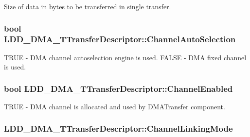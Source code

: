 Size of data in bytes to be transferred in single transfer. \hypertarget{struct_l_d_d___d_m_a___t_transfer_descriptor_aae81aa421cebab862ae4b8ca9d384318}{
\subsubsection[{Channel\-Auto\-Selection}]{\setlength{\rightskip}{0pt plus 5cm}bool L\-D\-D\-\_\-\-D\-M\-A\-\_\-\-T\-Transfer\-Descriptor\-::\-Channel\-Auto\-Selection}}\label{struct_l_d_d___d_m_a___t_transfer_descriptor_aae81aa421cebab862ae4b8ca9d384318}
T\-R\-U\-E -\/ D\-M\-A channel autoselection engine is used. F\-A\-L\-S\-E -\/ D\-M\-A fixed channel is used. \hypertarget{struct_l_d_d___d_m_a___t_transfer_descriptor_acf5f8fe95f319b19a591880ed8a7a3c0}{
\subsubsection[{Channel\-Enabled}]{\setlength{\rightskip}{0pt plus 5cm}bool L\-D\-D\-\_\-\-D\-M\-A\-\_\-\-T\-Transfer\-Descriptor\-::\-Channel\-Enabled}}\label{struct_l_d_d___d_m_a___t_transfer_descriptor_acf5f8fe95f319b19a591880ed8a7a3c0}
T\-R\-U\-E -\/ D\-M\-A channel is allocated and used by D\-M\-A\-Transfer component. \hypertarget{struct_l_d_d___d_m_a___t_transfer_descriptor_aad65e9cb849dda683d80af1dae92b5fb}{
\subsubsection[{Channel\-Linking\-Mode}]{ L\-D\-D\-\_\-\-D\-M\-A\-\_\-\-T\-Transfer\-Descriptor\-::\-Channel\-Linking\-Mode}}\label{struct_l_d_d___d_m_a___t_transfer_descriptor_aad65e9cb849dda683d80af1dae92b5fb}
